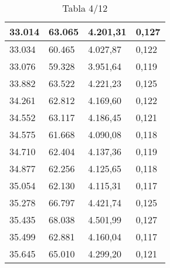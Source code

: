 \begin{table}[H]
{\begin{tabular}{| l | l | l |l |}
33.014	&	63.065	&	4.201,31	&	0,127	\\ \hline
33.034	&	60.465	&	4.027,87	&	0,122	\\ \hline
33.076	&	59.328	&	3.951,64	&	0,119	\\ \hline
33.882	&	63.522	&	4.221,23	&	0,125	\\ \hline
34.261	&	62.812	&	4.169,60	&	0,122	\\ \hline
34.552	&	63.117	&	4.186,45	&	0,121	\\ \hline
34.575	&	61.668	&	4.090,08	&	0,118	\\ \hline
34.710	&	62.404	&	4.137,36	&	0,119	\\ \hline
34.877	&	62.256	&	4.125,65	&	0,118	\\ \hline
35.054	&	62.130	&	4.115,31	&	0,117	\\ \hline
35.278	&	66.797	&	4.421,74	&	0,125	\\ \hline
35.435	&	68.038	&	4.501,99	&	0,127	\\ \hline
35.499	&	62.881	&	4.160,04	&	0,117	\\ \hline
35.645	&	65.010	&	4.299,20	&	0,121	\\ \hline
  \end{tabular}
  \caption*{Tabla 4/12}
}
\end{table}
